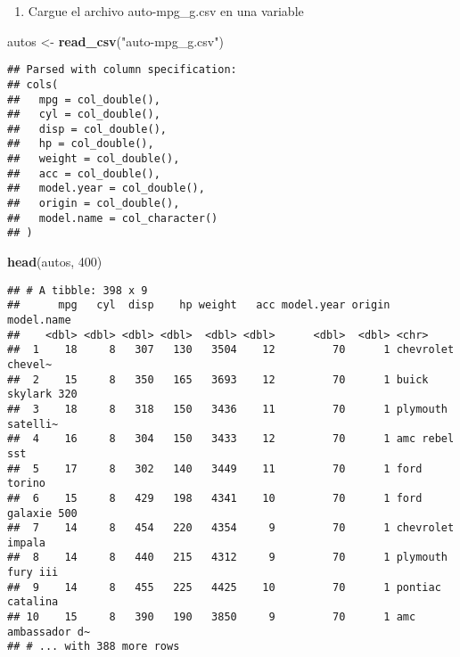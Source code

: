 \documentclass[]{article}
\newenvironment{Shaded}{\begin{snugshade}}{\end{snugshade}}
\newcommand{\KeywordTok}[1]{\textcolor[rgb]{0.13,0.29,0.53}{\textbf{{#1}}}}
\newcommand{\DecValTok}[1]{\textcolor[rgb]{0.00,0.00,0.81}{{#1}}}
\newcommand{\StringTok}[1]{\textcolor[rgb]{0.31,0.60,0.02}{{#1}}}
\newcommand{\NormalTok}[1]{{#1}}
\providecommand{\tightlist}{%
  \setlength{\itemsep}{0pt}\setlength{\parskip}{0pt}}
\begin{document}
\begin{enumerate}
\def\labelenumi{\arabic{enumi}.}
\tightlist
\item
  Cargue el archivo auto-mpg\_g.csv en una variable
\end{enumerate}

\begin{Shaded}
\begin{Highlighting}[]
\NormalTok{autos <-}\StringTok{ }\KeywordTok{read_csv}\NormalTok{(}\StringTok{"auto-mpg_g.csv"}\NormalTok{)}
\end{Highlighting}
\end{Shaded}

\begin{verbatim}
## Parsed with column specification:
## cols(
##   mpg = col_double(),
##   cyl = col_double(),
##   disp = col_double(),
##   hp = col_double(),
##   weight = col_double(),
##   acc = col_double(),
##   model.year = col_double(),
##   origin = col_double(),
##   model.name = col_character()
## )
\end{verbatim}

\begin{Shaded}
\begin{Highlighting}[]
\KeywordTok{head}\NormalTok{(autos, }\DecValTok{400}\NormalTok{)}
\end{Highlighting}
\end{Shaded}

\begin{verbatim}
## # A tibble: 398 x 9
##      mpg   cyl  disp    hp weight   acc model.year origin model.name       
##    <dbl> <dbl> <dbl> <dbl>  <dbl> <dbl>      <dbl>  <dbl> <chr>            
##  1    18     8   307   130   3504    12         70      1 chevrolet chevel~
##  2    15     8   350   165   3693    12         70      1 buick skylark 320
##  3    18     8   318   150   3436    11         70      1 plymouth satelli~
##  4    16     8   304   150   3433    12         70      1 amc rebel sst    
##  5    17     8   302   140   3449    11         70      1 ford torino      
##  6    15     8   429   198   4341    10         70      1 ford galaxie 500 
##  7    14     8   454   220   4354     9         70      1 chevrolet impala 
##  8    14     8   440   215   4312     9         70      1 plymouth fury iii
##  9    14     8   455   225   4425    10         70      1 pontiac catalina 
## 10    15     8   390   190   3850     9         70      1 amc ambassador d~
## # ... with 388 more rows
\end{verbatim}
\end{document}
